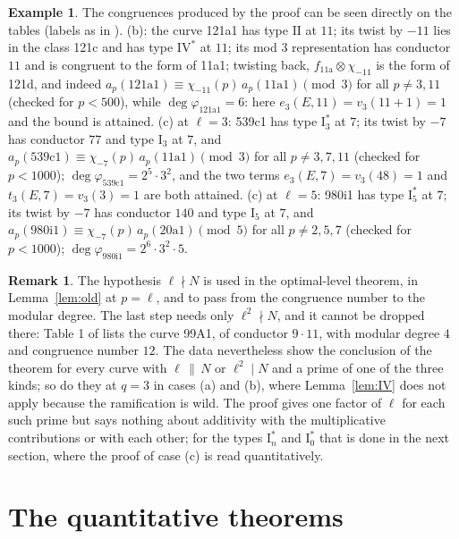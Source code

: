 \documentclass[11pt]{amsart}
\theoremstyle{definition}
\newtheorem{remark}[theorem]{Remark}
\newtheorem{example}[theorem]{Example}
\begin{document}
\begin{example}
The congruences produced by the proof can be seen directly on the tables (labels as in \cite{Cremona97}). (b): the curve 121a1 has type $\mathrm{II}$ at $11$; its twist by $-11$ lies in the class 121c and has type $\mathrm{IV}^*$ at $11$; its mod $3$ representation has conductor $11$ and is congruent to the form of 11a1; twisting back, $f_{\text{11a}}\otimes\chi_{-11}$ is the form of 121d, and indeed $a_p(\text{121a1})\equiv\chi_{-11}(p)\,a_p(\text{11a1})\pmod 3$ for all $p\ne3,11$ (checked for $p<500$), while $\deg\varphi_{\text{121a1}}=6$: here $e_3(E,11)=v_3(11+1)=1$ and the bound is attained. (c) at $\ell=3$: 539c1 has type $\mathrm{I}_3^*$ at $7$; its twist by $-7$ has conductor $77$ and type $\mathrm{I}_3$ at $7$, and $a_p(\text{539c1})\equiv\chi_{-7}(p)\,a_p(\text{11a1})\pmod3$ for all $p\ne3,7,11$ (checked for $p<1000$); $\deg\varphi_{\text{539c1}}=2^5\cdot3^2$, and the two terms $e_3(E,7)=v_3(48)=1$ and $t_3(E,7)=v_3(3)=1$ are both attained. (c) at $\ell=5$: 980i1 has type $\mathrm{I}_5^*$ at $7$; its twist by $-7$ has conductor $140$ and type $\mathrm{I}_5$ at $7$, and $a_p(\text{980i1})\equiv\chi_{-7}(p)\,a_p(\text{20a1})\pmod5$ for all $p\ne2,5,7$ (checked for $p<1000$); $\deg\varphi_{\text{980i1}}=2^6\cdot3^2\cdot5$.
\end{example}

\begin{remark}
The hypothesis $\ell\nmid N$ is used in the optimal-level theorem, in Lemma~\ref{lem:old} at $p=\ell$, and to pass from the congruence number to the modular degree. The last step needs only $\ell^2\nmid N$, and it cannot be dropped there: Table 1 of \cite{ARS12} lists the curve 99A1, of conductor $9\cdot11$, with modular degree $4$ and congruence number $12$. The data nevertheless show the conclusion of the theorem for every curve with $\ell\,\|\,N$ or $\ell^2\mid N$ and a prime of one of the three kinds; so do they at $q=3$ in cases (a) and (b), where Lemma~\ref{lem:IV} does not apply because the ramification is wild. The proof gives one factor of $\ell$ for each such prime but says nothing about additivity with the multiplicative contributions or with each other; for the types $\mathrm{I}_n^*$ and $\mathrm{I}_0^*$ that is done in the next section, where the proof of case (c) is read quantitatively.
\end{remark}

\section{The quantitative theorems}\label{sec:quant}
\end{document}
